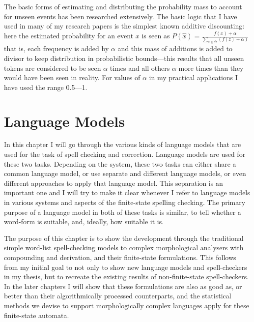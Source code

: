 \documentclass[officiallayout,draft]{unihelcompling}
\begin{document}
The basic forms of estimating and distributing the probability mass to account
for unseen events has been researched extensively. The basic logic that I have
used in many of my research papers is the simplest known additive discounting:
here the estimated probability for an event $x$ is seen as $P(\hat{x}) =
\frac{f(x) + \alpha}{\sum_{z \in \mathcal{D}}(f(z) + \alpha)}$ that is, each
frequency is added by $\alpha$ and this mass of additions is added to divisor
to keep distribution in probabilistic bounds---this results that all unseen
tokens are considered to be seen $\alpha$ times and all others $\alpha$ more
times than they would have been seen in reality. For values of $\alpha$ in
my practical applications I have used the range 0.5---1.



\chapter{Language Models}
\label{chap:language-models}

In this chapter I will go through the various kinds of language models that are
used for the task of spell checking and correction. Language models are used
for these two tasks. Depending on the system, these two tasks can either share
a common language model, or use separate and different language models, or even
different approaches to apply that language model. This separation is an
important one and I will try to make it clear whenever I refer to language
models in various systems and aspects of the finite-state spelling checking.
The primary purpose of a language model in both of these tasks is similar, to
tell whether a word-form is suitable, and, ideally, how suitable it is.

The purpose of this chapter is to show the development through the traditional
simple word-list spell-checking models to complex morphological analysers with
compounding and derivation, and their finite-state formulations. This follows
from my initial goal to not only to show new language models and spell-checkers
in my thesis, but to recreate the existing results of non-finite-state
spell-checkers. In the later chapters I will show that these formulations are
also as good as, or better than their algorithmically processed counterparts,
and the statistical methods we devise to support morphologically complex
languages apply for these finite-state automata.
\end{document}

